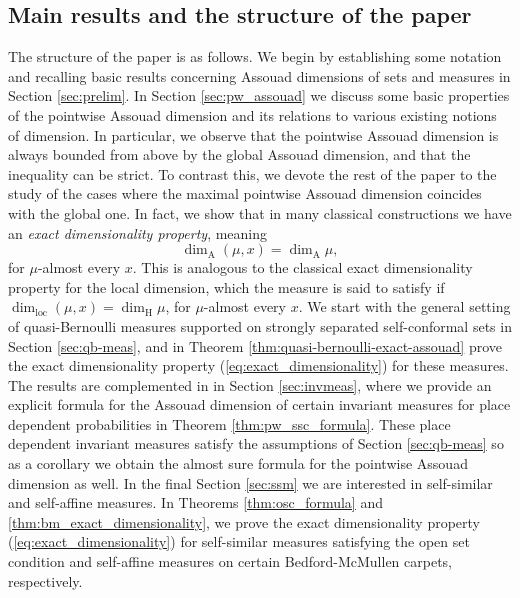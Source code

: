 \documentclass{PRM}
\newcommand{\adim}{\dim_{\mathrm{A}}}
\theoremstyle{plain}
\theoremstyle{definition}
\theoremstyle{remark}
\begin{document}
\subsection{Main results and the structure of the paper}
The structure of the paper is as follows. We begin by establishing some notation and recalling basic results concerning Assouad dimensions of sets and measures in Section \ref{sec:prelim}. In Section \ref{sec:pw_assouad} we discuss some basic properties of the pointwise Assouad dimension and its relations to various existing notions of dimension. In particular, we observe that the pointwise Assouad dimension is always bounded from above by the global Assouad dimension, and that the inequality can be strict. To contrast this, we devote the rest of the paper to the study of the cases where the maximal pointwise Assouad dimension coincides with the global one.
In fact, we show that in many classical constructions we have an \emph{exact dimensionality property}, meaning
\begin{equation}\label{eq:exact_dimensionality}
    \adim(\mu,x)= \adim\mu,
\end{equation}
for $\mu$-almost every $x$. This is analogous to the classical exact dimensionality property for the local dimension, which the measure is said to satisfy if $\dim_{\mathrm{loc}}(\mu,x)=\dim_{\mathrm{H}}\mu$, for $\mu$-almost every $x$.  We start with the general setting of quasi-Bernoulli measures supported on strongly separated self-conformal sets in Section \ref{sec:qb-meas},  and in Theorem \ref{thm:quasi-bernoulli-exact-assouad} prove the exact dimensionality property (\ref{eq:exact_dimensionality}) for these measures. The results are complemented in in Section \ref{sec:invmeas}, where we provide an explicit formula for the Assouad dimension of certain invariant measures for place dependent probabilities in Theorem \ref{thm:pw_ssc_formula}. These place dependent invariant measures satisfy the assumptions of Section \ref{sec:qb-meas} so as a corollary we obtain the almost sure formula for the pointwise Assouad dimension as well. In the final Section \ref{sec:ssm} we are interested in self-similar and self-affine measures. In Theorems \ref{thm:osc_formula} and \ref{thm:bm_exact_dimensionality}, we prove the exact dimensionality property (\ref{eq:exact_dimensionality}) for self-similar measures satisfying the open set condition and self-affine measures on certain Bedford-McMullen carpets, respectively.
\end{document}

